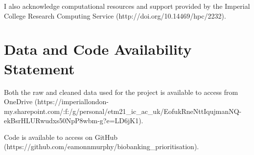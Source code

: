 \documentclass[12pt]{article}
\begin{document}
	I also acknowledge computational resources and support provided by the Imperial College Research Computing Service (http://doi.org/10.14469/hpc/2232).
	
	\pagebreak
	
	\section{Data and Code Availability Statement}\label{availability_statement}
	Both the raw and cleaned data used for the project is available to
	access from OneDrive (https://imperiallondon-my.sharepoint.com/:f:/g/personal/etm21\_ic\_ac\_uk/EofukRneNttIqujmanNQ-ekBsrHLURwudxs50NpP8wbm-g?e=LD6jK1).
	
	Code is available to access on GitHub (https://github.com/eamonnmurphy/biobanking\_prioritisation).
	

	\pagebreak
	
	
	
\end{document}
